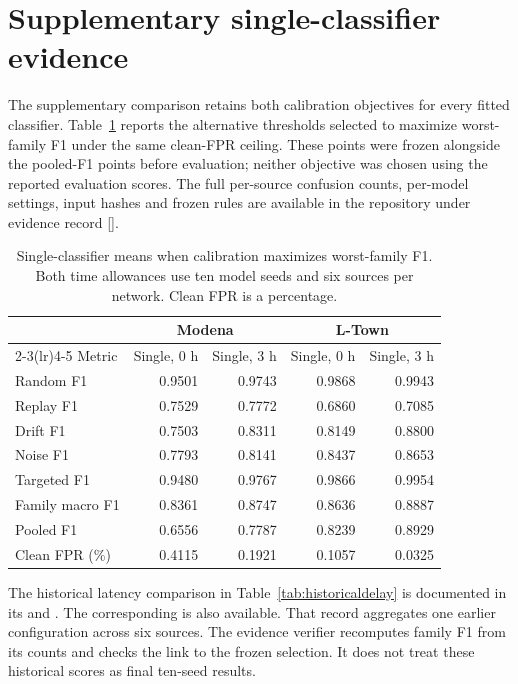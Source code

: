 \section{Supplementary single-classifier evidence}
\label{sec:baselineappendix}
The supplementary comparison retains both calibration objectives for every fitted classifier. Table~\ref{tab:balancedbaseline} reports the alternative thresholds selected to maximize worst-family F1 under the same clean-FPR ceiling. These points were frozen alongside the pooled-F1 points before evaluation; neither objective was chosen using the reported evaluation scores. The full per-source confusion counts, per-model settings, input hashes and frozen rules are available in the repository under evidence record [].
\begin{table}[!htbp]
\centering\small
\caption[Single-classifier results with family-balanced calibration]{Single-classifier means when calibration maximizes worst-family F1. Both time allowances use ten model seeds and six sources per network. Clean FPR is a percentage.}
\label{tab:balancedbaseline}
\begin{tabular}{@{}lrrrr@{}}
\toprule
& \multicolumn{2}{c}{Modena} & \multicolumn{2}{c}{L-Town}\\
\cmidrule(lr){2-3}\cmidrule(lr){4-5}
Metric & Single, 0 h & Single, 3 h & Single, 0 h & Single, 3 h\\
\midrule
Random F1 & 0.9501 & 0.9743 & 0.9868 & 0.9943\\
Replay F1 & 0.7529 & 0.7772 & 0.6860 & 0.7085\\
Drift F1 & 0.7503 & 0.8311 & 0.8149 & 0.8800\\
Noise F1 & 0.7793 & 0.8141 & 0.8437 & 0.8653\\
Targeted F1 & 0.9480 & 0.9767 & 0.9866 & 0.9954\\
Family macro F1 & 0.8361 & 0.8747 & 0.8636 & 0.8887\\
Pooled F1 & 0.6556 & 0.7787 & 0.8239 & 0.8929\\
Clean FPR (\%) & 0.4115 & 0.1921 & 0.1057 & 0.0325\\
\bottomrule
\end{tabular}
\end{table}
\FloatBarrier
The historical latency comparison in Table~\ref{tab:historicaldelay} is documented in its  and . The corresponding  is also available. That record aggregates one earlier configuration across six sources. The evidence verifier recomputes family F1 from its counts and checks the link to the frozen selection. It does not treat these historical scores as final ten-seed results.
